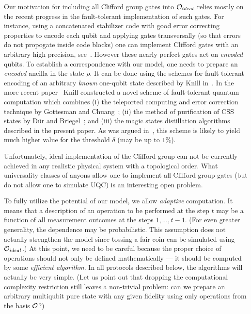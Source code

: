 \documentclass[pra,twocolumn,showpacs]{revtex4}
\newcommand{\calO}{{\cal O }}
\begin{document}
Our motivation for including 
all Clifford group gates into $\calO_{ideal}$ relies mostly
on the recent progress in the fault-tolerant implementation of such
gates.
For instance, using a concatenated stabilizer code with good error
correcting properties to encode each qubit
and applying gates transversally (so that errors do not propogate
inside code blocks) one can implement Clifford gates with 
an arbitrary high precision, see~\cite{G97a}. However these
nearly perfect gates act on  {\it encoded} qubits.
To establish a correspondence with our model, one needs to
prepare an {\it encoded} ancilla in the state $\rho$. 
It can be done using the schemes
for fault-tolerant encoding of an arbitrary {\it known} one-qubit state
described by Knill in~\cite{Knill04_feb}. 
In the more recent paper~\cite{Knill04_april} Knill 
constructed a novel scheme of fault-tolerant quantum computation
which combines
(i) the teleported computing and error correction technique 
by Gottesman and Chuang~\cite{Nature99};
(ii) the method of purification of CSS states by D\"ur and Briegel~\cite{DurBriegel03};
and (iii) the magic states distillation algorithms described in the present paper. 
As was argued in~\cite{Knill04_april}, this scheme is likely to yield much higher
value for the threshold $\delta$ (may be up to $1\%$).

Unfortunately, ideal implementation of the Clifford group can not be currently
achieved in any realistic physical system with a topological order.
What universality classes of anyons  allow one to implement all Clifford
group gates (but do not allow one to simulate UQC) is an interesting open
problem. 

To fully utilize the potential of our model, we allow {\it adaptive}
computation. It means that a description of 
an operation to be performed at
the step $t$ may be a function of all 
measurement outcomes at the steps $1,\ldots,t-1$.
(For even greater
generality, the dependence may be probabilistic. This assumption does not
actually strengthen the model since tossing a fair coin can be simulated using
$\calO_{ideal}$.) At this point, we need to be careful because the proper
choice of  operations should not only be defined mathematically --- it
should be computed by some {\it efficient algorithm}.  In all protocols
described below, the algorithms will actually be very simple. (Let us 
point out that dropping the computational complexity restriction still 
leaves a non-trivial problem: can we prepare an arbitrary multiqubit pure state with
any given fidelity using only operations from the basis $\calO$?) 
\end{document}
